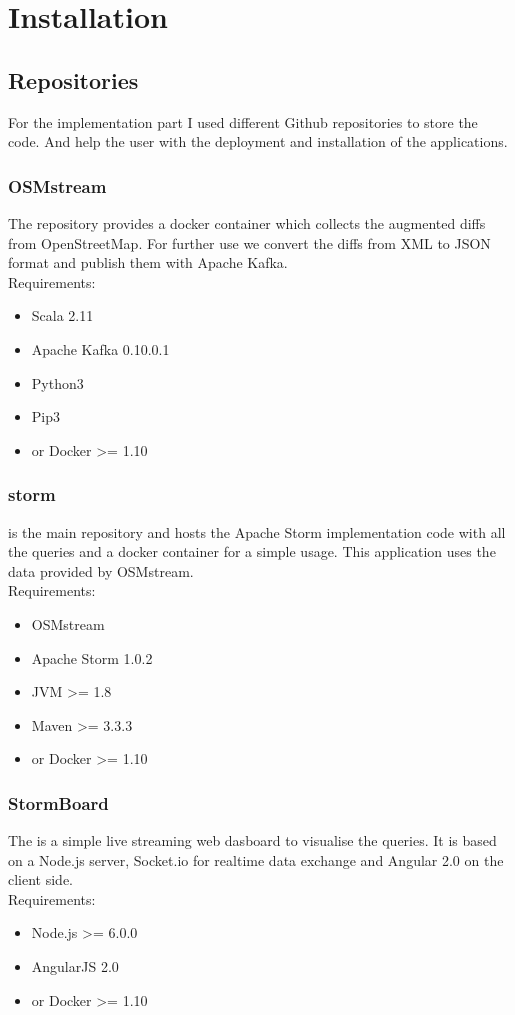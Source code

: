 \chapter{Installation}
\newpage

\section{Repositories}
For the implementation part I used different Github repositories to store the code.
And help the user with the deployment and installation of the applications.

\subsection{OSMstream}
The  repository provides a docker container which collects the augmented diffs from OpenStreetMap.
For further use we convert the diffs from XML to JSON format and publish them with Apache Kafka. \\
\medskip
Requirements:
\begin{itemize}
    \item Scala 2.11
    \item Apache Kafka 0.10.0.1
    \item Python3
    \item Pip3
    \item or Docker \textgreater= 1.10
\end{itemize}
\newpage
\subsection{storm}
 is the main repository and hosts the Apache Storm implementation code with all the queries and a docker container for a simple usage.
This application uses the data provided by OSMstream.\\
\medskip
Requirements:
\begin{itemize}
    \item OSMstream
    \item Apache Storm 1.0.2
    \item JVM \textgreater= 1.8
    \item Maven \textgreater= 3.3.3
    \item or Docker \textgreater= 1.10
\end{itemize}


\subsection{StormBoard}
The  is a simple live streaming web dasboard to visualise the queries.
It is based on a Node.js server, Socket.io for realtime data exchange and Angular 2.0 on the client side.\\
\medskip
Requirements:
\begin{itemize}
    \item Node.js >= 6.0.0
    \item AngularJS 2.0
    \item or Docker \textgreater= 1.10
\end{itemize}
